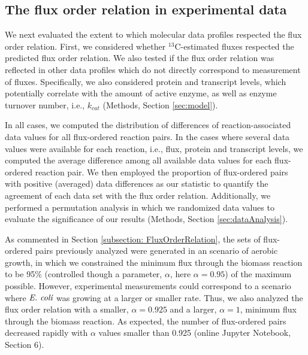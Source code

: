 \documentclass[12pt]{article}
\begin{document}
\subsection{The flux order relation in experimental data}
We next evaluated the extent to which molecular data profiles respected the flux order relation. First, we considered whether ${}^{13}\mathrm{C}$-estimated fluxes respected the predicted flux order relation. We also tested if the flux order relation was reflected in other data profiles which do not directly correspond to measurement of fluxes. Specifically, we also considered protein and transcript levels, which potentially correlate with the amount of active enzyme, as well as enzyme turnover number, i.e., $k_{cat}$ (Methods, Section \ref{sec:model}).

In all cases, we computed the distribution of differences of reaction-associated data values for all flux-ordered reaction pairs. In the cases where several data values were available for each reaction, i.e., flux, protein and transcript levels, we computed the average difference among all available data values for each flux-ordered reaction pair. We then employed the proportion of flux-ordered pairs with positive (averaged) data differences as our statistic to quantify the agreement of each data set with the flux order relation. Additionally, we performed a permutation analysis in which we randomized data values to evaluate the significance of our results (Methods, Section \ref{sec:dataAnalysis}).

As commented in Section \ref{subsection: FluxOrderRelation}, the sets of flux-ordered pairs previously analyzed were generated in an scenario of aerobic growth, in which we constrained the minimum flux through the biomass reaction to be 95\% (controlled though a parameter, $\alpha$, here $\alpha=0.95$) of the maximum possible. However, experimental measurements could correspond to a scenario where $\emph{E. coli}$ was growing at a larger or smaller rate. Thus, we also analyzed the flux order relation with a smaller, $\alpha=0.925$ and a larger, $\alpha=1$, minimum flux through the biomass reaction. As expected, the number of flux-ordered pairs decreased rapidly with $\alpha$ values smaller than 0.925 (online Jupyter Notebook, Section 6).
\end{document}
